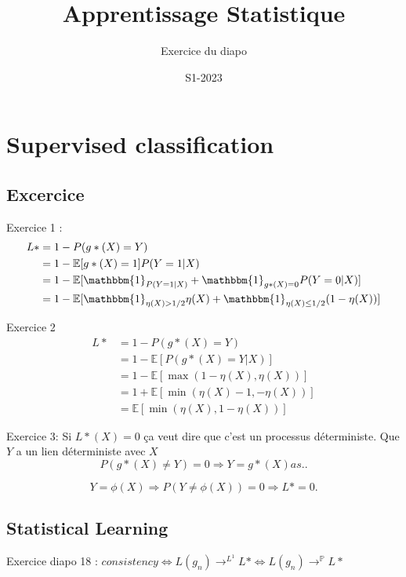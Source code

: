 \documentclass{article}
\title{Apprentissage Statistique}
\author{Exercice du diapo}
\date{S1-2023}
\theoremstyle{plain}%
\theoremstyle{definition}
\theoremstyle{remark}
\begin{document}
\maketitle

\section{Supervised classification}
\subsection{Excercice}
Exercice 1 : 
\begin{align*}
    L* &= 1 - P(g*(X) = Y) \\
        &= 1 - \mathbb{E} [ g*(X) = 1] P( Y = 1 | X) \\
        &= 1 - \mathbb{E} [ \mathbbm{1}_{P(Y=1 | X)} + \mathbbm{1}_{g*(X) = 0} P(Y=0 | X)] \\
        &= 1 - \mathbb{E} [ \mathbbm{1}_{\eta (X) > 1/2} \eta (X) + \mathbbm{1}_{\eta (X) \leq  1/2} (1 - \eta (X))]
\end{align*}
    
Exercice 2
\begin{align*}
    L* &= 1 - P(g*(X) = Y) \\
        &= 1 - \mathbb{E} [P(g*(X) = Y | X)] \\
        &= 1 - \mathbb{E} [ \max ( 1 - \eta (X) , \eta (X))] \\
        &= 1 + \mathbb{E} [ \min (\eta (X) - 1 , - \eta (X))] \\
        &= \mathbb{E} [ \min  (\eta (X) , 1 - \eta (X))]
\end{align*}

Exercice 3:
Si $ L*(X) = 0 $ ça veut dire que c'est un processus déterministe. Que $ Y $  a un lien déterministe avec $ X $ 
\[
    P(g*(X) \neq  Y) = 0 \Rightarrow  Y = g*(X) as. 
.\]

\[
    Y = \phi (X) \Rightarrow P(Y \neq \phi (X) ) = 0 \Rightarrow L* = 0
.\]

\subsection{Statistical Learning}
Exercice diapo 18 : $ consistency \Leftrightarrow L(g_n) \to ^{L^1} L* \Leftrightarrow L(g_n) \to ^{ \mathbb{P}} L* $ 
\end{document}
